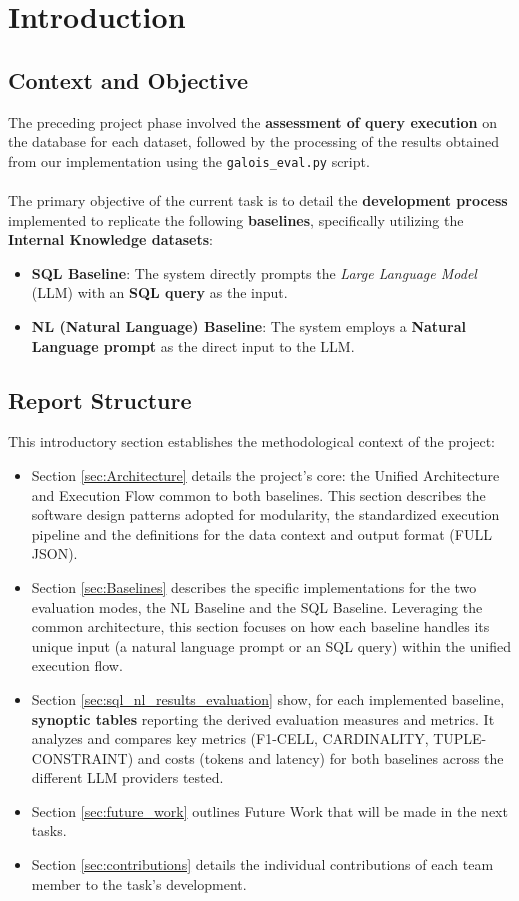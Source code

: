 \section{Introduction}
\label{sec:introduction}
\vspace{2em}
\subsection{Context and Objective}
The preceding project phase involved the \textbf{assessment of query execution} on the database for each dataset, followed by the processing of the results obtained from our implementation using the \texttt{galois\_eval.py} script.
\\\\
The primary objective of the current task is to detail the \textbf{development process} implemented to replicate the following \textbf{baselines}, specifically utilizing the \textbf{Internal Knowledge datasets}:

\begin{itemize}[leftmargin=*]
    \item \textbf{SQL Baseline}: The system directly prompts the \emph{Large Language Model} (LLM) with an \textbf{SQL query} as the input. 
    \item \textbf{NL (Natural Language) Baseline}: The system employs a \textbf{Natural Language prompt} as the direct input to the LLM.
\end{itemize}    
\vspace{2em}
\subsection{Report Structure}
This introductory section establishes the methodological context of the project:
\begin{itemize}[leftmargin=*]
    \item Section \ref{sec:Architecture} details the project's core: the Unified Architecture and Execution Flow common to both baselines. This section describes the software design patterns adopted for modularity, the standardized execution pipeline and the definitions for the data context and output format (FULL JSON).
    \item Section \ref{sec:Baselines} describes the specific implementations for the two evaluation modes, the NL Baseline and the SQL Baseline. Leveraging the common architecture, this section focuses on how each baseline handles its unique input (a natural language prompt or an SQL query) within the unified execution flow.
    \item Section \ref{sec:sql_nl_results_evaluation}  show, for each implemented baseline, \textbf{synoptic tables} reporting the derived evaluation measures and metrics. It analyzes and compares key metrics (F1-CELL, CARDINALITY, TUPLE-CONSTRAINT) and costs (tokens and latency) for both baselines across the different LLM providers tested.
    \item Section \ref{sec:future_work} outlines Future Work that will be made in the next tasks.
    \item Section \ref{sec:contributions} details the individual contributions of each team member to the task's development.
\end{itemize}
